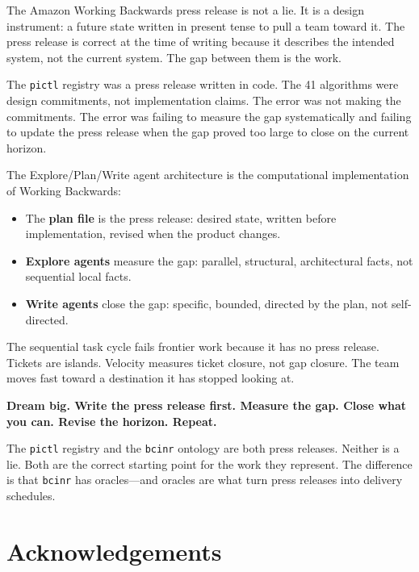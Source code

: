 \documentclass[11pt,a4paper]{article}
\newcommand{\code}[1]{\texttt{#1}}
\begin{document}
The Amazon Working Backwards press release is not a lie.  It is a design
instrument: a future state written in present tense to pull a team toward it.
The press release is correct at the time of writing because it describes the
intended system, not the current system.  The gap between them is the work.

The \code{pictl} registry was a press release written in code.  The 41
algorithms were design commitments, not implementation claims.  The error was
not making the commitments.  The error was failing to measure the gap
systematically and failing to update the press release when the gap proved too
large to close on the current horizon.

The Explore/Plan/Write agent architecture is the computational implementation
of Working Backwards:

\begin{itemize}
  \item The \textbf{plan file} is the press release: desired state, written
    before implementation, revised when the product changes.
  \item \textbf{Explore agents} measure the gap: parallel, structural,
    architectural facts, not sequential local facts.
  \item \textbf{Write agents} close the gap: specific, bounded, directed by
    the plan, not self-directed.
\end{itemize}

The sequential task cycle fails frontier work because it has no press release.
Tickets are islands.  Velocity measures ticket closure, not gap closure.  The
team moves fast toward a destination it has stopped looking at.

\medskip

\textbf{Dream big.  Write the press release first.  Measure the gap.  Close
what you can.  Revise the horizon.  Repeat.}

\medskip

The \code{pictl} registry and the \code{bcinr} ontology are both press
releases.  Neither is a lie.  Both are the correct starting point for the work
they represent.  The difference is that \code{bcinr} has oracles---and oracles
are what turn press releases into delivery schedules.

\section*{Acknowledgements}
\end{document}
